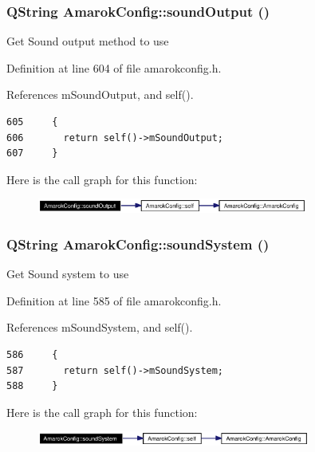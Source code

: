 \subsubsection{\setlength{\rightskip}{0pt plus 5cm}QString Amarok\-Config::sound\-Output ()\hspace{0.3cm}{\tt  [inline, static]}}\label{classAmarokConfig_AmarokConfige62}


Get Sound output method to use 

Definition at line 604 of file amarokconfig.h.

References m\-Sound\-Output, and self().



\footnotesize\begin{verbatim}605     {
606       return self()->mSoundOutput;
607     }
\end{verbatim}\normalsize 


Here is the call graph for this function:\begin{figure}[H]
\begin{center}
\leavevmode
\includegraphics[width=252pt]{classAmarokConfig_AmarokConfige62_cgraph}
\end{center}
\end{figure}
\subsubsection{\setlength{\rightskip}{0pt plus 5cm}QString Amarok\-Config::sound\-System ()\hspace{0.3cm}{\tt  [inline, static]}}\label{classAmarokConfig_AmarokConfige60}


Get Sound system to use 

Definition at line 585 of file amarokconfig.h.

References m\-Sound\-System, and self().



\footnotesize\begin{verbatim}586     {
587       return self()->mSoundSystem;
588     }
\end{verbatim}\normalsize 


Here is the call graph for this function:\begin{figure}[H]
\begin{center}
\leavevmode
\includegraphics[width=254pt]{classAmarokConfig_AmarokConfige60_cgraph}
\end{center}
\end{figure}
